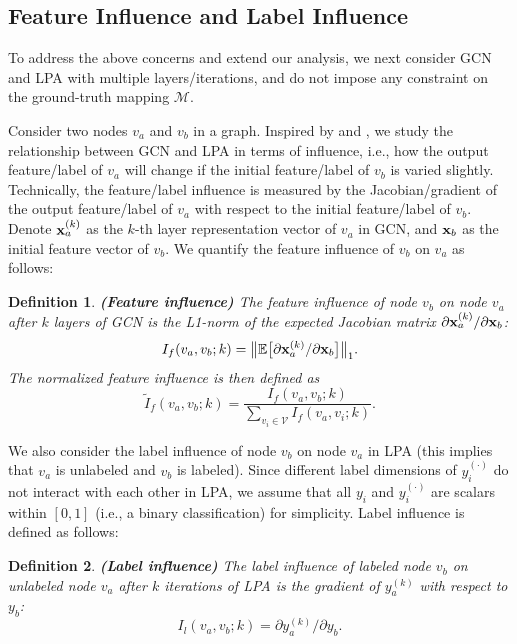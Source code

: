 \documentclass{article}
\newtheorem{definition}{Definition}
\begin{document}
	\subsection{Feature Influence and Label Influence}
	    To address the above concerns and extend our analysis, we next consider GCN and LPA with multiple layers/iterations, and do not impose any constraint on the ground-truth mapping $\mathcal M$.
		
		Consider two nodes $v_a$ and $v_b$ in a graph.
		Inspired by \cite{koh2017understanding} and \cite{xu2018representation}, we study the relationship between GCN and LPA in terms of influence, i.e., how the output feature/label of $v_a$ will change if the initial feature/label of $v_b$ is varied slightly.
		Technically, the feature/label influence is measured by the Jacobian/gradient of the output feature/label of $v_a$ with respect to the initial feature/label of $v_b$.
		Denote ${\bf x}_a^{(k)}$ as the $k$-th layer representation vector of $v_a$ in GCN, and ${\bf x}_b$ as the initial feature vector of $v_b$.
		We quantify the feature influence of $v_b$ on $v_a$ as follows:
		
		\begin{definition}
			\rm\textbf{(Feature influence)}
			The feature influence of node $v_b$ on node $v_a$ after $k$ layers of GCN is the L1-norm of the expected Jacobian matrix $\partial {\bf x}_a^{(k)} / \partial {\bf x}_b$:
			\begin{equation}
				I_f(v_a, v_b; k) = \big\| \mathbb E \big[ \partial {\bf x}_a^{(k)} / \partial {\bf x}_b \big] \big\|_1.
			\end{equation}
			The normalized feature influence is then defined as
			\begin{equation}
				\tilde I_f(v_a, v_b; k) = \frac{I_f(v_a, v_b; k)}{\sum\nolimits_{v_i \in \mathcal V} I_f(v_a, v_i; k)}.
			\end{equation}
		\end{definition}
		
		We also consider the label influence of node $v_b$ on node $v_a$ in LPA (this implies that $v_a$ is unlabeled and $v_b$ is labeled).
		Since different label dimensions of $y_i^{(\cdot)}$ do not interact with each other in LPA, we assume that all $y_i$ and $y_i^{(\cdot)}$ are scalars within $[0, 1]$ (i.e., a binary classification) for simplicity.
		Label influence is defined as follows:
		
		\begin{definition}
			\rm\textbf{(Label influence)}
			The label influence of labeled node $v_b$ on unlabeled node $v_a$ after $k$ iterations of LPA is the gradient of $y_a^{(k)}$ with respect to $y_b$:
			\begin{equation}
				I_l(v_a, v_b; k) = \partial y_a^{(k)} / \partial y_b.
			\end{equation}
			
		\end{definition}
		
\end{document}
